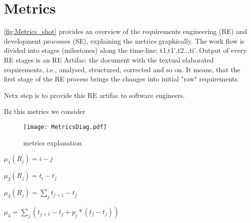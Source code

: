 \section{Metrics}
\label{sec:Solution} 

 \autoref{fig:Metrics_shot} provides an overview of the requirements engineering (RE) and development processes (SE), explaining the metrics graphically. The work flow is divided into stages (milestones) along the time-line: t1,t1',t2...ti'.
 Output of every RE stages is an RE Artifac: the document with the textual elaborated requirements, i.e., analysed, structured, corrected and so on. It means, that the first stage of the RE process brings the changes into initial "raw" requirements.
 
 Netx step is to provide this RE artifac to  software engineers.
 
 Bz this metrics we consider 



\begin{figure}[!t]
	\centering
		\texttt{[image: MetricsDiag.pdf]}
	\caption{metrics explanation}
	\label{fig:Metrics_shot}
\end{figure}


$\mu_{1}(R_{j}) = i-j$

$\mu_{2}(R_{j}) = t_{i}-t_{j}$

$\mu_{3}(R_{j}) = \displaystyle\sum_{j} t_{j+1}-t_{j}\acute{}$

$\mu_{4} = \displaystyle\sum_{j} (t_{j+1}-t_{j}\acute{} + p_{j}*(t_{j}\acute{} - t_{j}))$


